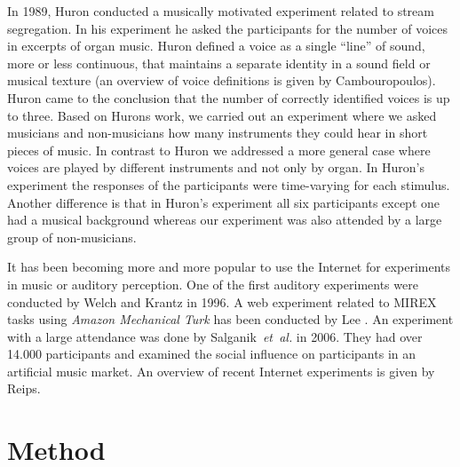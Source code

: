 In 1989, Huron conducted a musically motivated experiment related to stream segregation\cite{Huron1989}. In his experiment he asked the participants for the number of voices in excerpts of organ music. Huron defined a voice as a single ``line'' of sound, more or less continuous, that maintains a separate identity in a sound field or musical texture (an overview of voice definitions is given by Cambouropoulos\cite{Cambouropoulos2008}). Huron came to the conclusion that the number of correctly identified voices is up to three. Based on Hurons work, we carried out an experiment where we asked musicians and non-musicians how many instruments they could hear in short pieces of music\cite{Stoter2013}. In contrast to Huron we addressed a more general case where voices are played by different instruments and not only by organ. In Huron's experiment the responses of the participants were time-varying for each stimulus. Another difference is that in Huron's experiment all six participants except one had a musical background whereas our experiment was also attended by a large group of non-musicians.

It has been becoming more and more popular to use the Internet for experiments in music or auditory perception. One of the first auditory experiments were conducted by Welch and Krantz\cite{Welch1996} in 1996. A web experiment related to MIREX tasks using \emph{Amazon Mechanical Turk} has been conducted by Lee \cite{lee2010}. An experiment with a large attendance was done by Salganik~\textit{et~al.}\cite{Salganik2006} in 2006. They had over 14.000 participants and examined the social influence on participants in an artificial music market. An overview of recent Internet experiments is given by Reips\cite{Reips2012}.

\section{Method}\label{sec:method}

